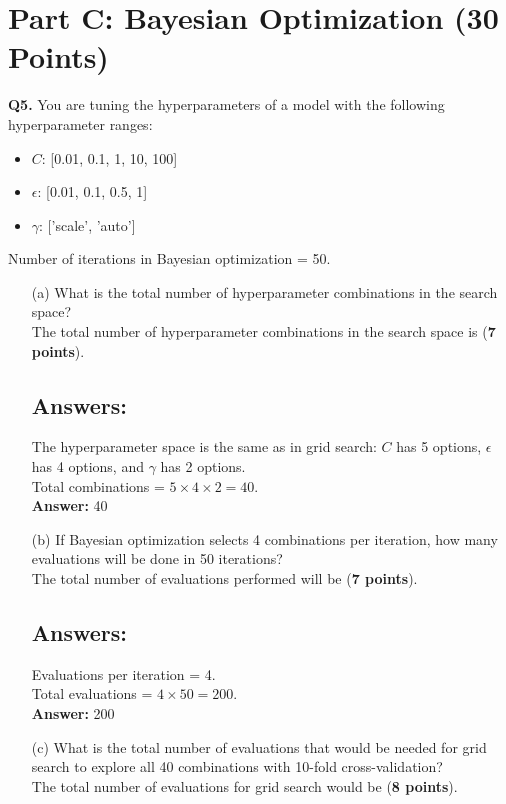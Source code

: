 \documentclass{article}
\begin{document}
\section*{Part C: Bayesian Optimization (30 Points)}
\textbf{Q5.} You are tuning the hyperparameters of a model with the following
hyperparameter ranges:
\begin{itemize}
      \item $C$: [0.01, 0.1, 1, 10, 100]
      \item $\epsilon$: [0.01, 0.1, 0.5, 1]
      \item $\gamma$: ['scale', 'auto']
\end{itemize}
Number of iterations in Bayesian optimization = 50.
\begin{enumerate}
      \item[(a)] What is the total number of hyperparameter combinations in the
            search space? \\
            The total number of hyperparameter combinations in the search space is \underline{\hspace{3cm}} (\textbf{7 points}).
            \subsection*{Answers:}
            The hyperparameter space is the same as in grid search: $C$ has 5 options, $\epsilon$ has 4 options, and $\gamma$ has 2 options. \\
            Total combinations = $5 \times 4 \times 2 = 40$. \\
            \textbf{Answer:} 40
      \item[(b)] If Bayesian optimization selects 4 combinations per iteration, how
            many evaluations will be done in 50 iterations? \\
            The total number of evaluations performed will be \underline{\hspace{3cm}} (\textbf{7 points}).
            \subsection*{Answers:}
            Evaluations per iteration = 4. \\
            Total evaluations = $4 \times 50 = 200$. \\
            \textbf{Answer:} 200
      \item[(c)] What is the total number of evaluations that would be needed for
            grid search to explore all 40 combinations with 10-fold cross-validation? \\
            The total number of evaluations for grid search would be \underline{\hspace{3cm}} (\textbf{8 points}).

\end{enumerate}
\end{document}
